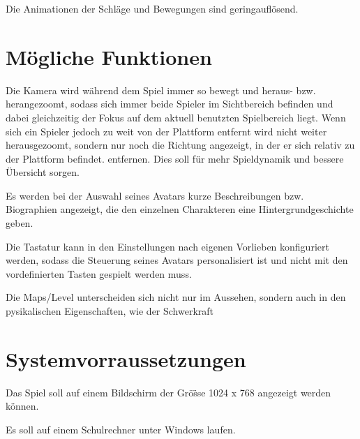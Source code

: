 \documentclass[11pt]{article}
\newcommand{\paragraphspace}{0.3cm}
\begin{document}
    \noindent
    Die Animationen der Schl\"age und Bewegungen sind geringaufl\"osend.



    \section{M\"ogliche Funktionen}\label{sec:kann}

    Die Kamera wird w\"ahrend dem Spiel immer so bewegt und heraus- bzw. herangezoomt, sodass sich immer beide
    Spieler im Sichtbereich befinden und dabei gleichzeitig der Fokus auf dem aktuell benutzten Spielbereich liegt. Wenn sich
    ein Spieler jedoch zu weit von der Plattform entfernt wird nicht weiter herausgezoomt, sondern nur noch die Richtung angezeigt,
    in der er sich relativ zu der Plattform befindet. entfernen. Dies soll f\"ur mehr Spieldynamik und bessere \"Ubersicht sorgen.
    \vspace{\paragraphspace}

    \noindent
    Es werden bei der Auswahl seines Avatars kurze Beschreibungen bzw. Biographien angezeigt, die den einzelnen Charakteren
    eine Hintergrundgeschichte geben.
    \vspace{\paragraphspace}

    \noindent
    Die Tastatur kann in den Einstellungen nach eigenen Vorlieben konfiguriert werden, sodass die Steuerung seines Avatars
    personalisiert ist und nicht mit den vordefinierten Tasten gespielt werden muss.
    \vspace{\paragraphspace}

    \noindent
    Die Maps/Level unterscheiden sich nicht nur im Aussehen, sondern auch in den pysikalischen Eigenschaften, wie der
    Schwerkraft

    \section{Systemvorraussetzungen}\label{sec:systemvorraussetungen}

    Das Spiel soll auf einem Bildschirm der Gr\"o\"ss{}e 1024 x 768 angezeigt werden k\"onnen.
    \vspace{\paragraphspace}

    \noindent
    Es soll auf einem Schulrechner unter Windows laufen.
\end{document}
